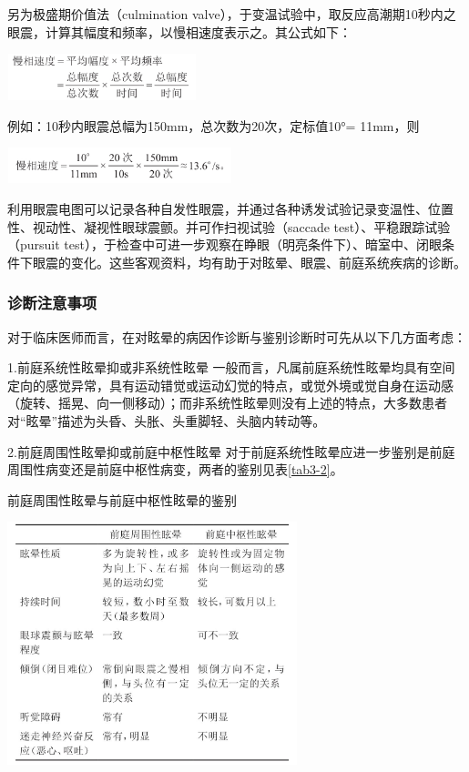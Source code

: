 另为极盛期价值法（culmination
valve），于变温试验中，取反应高潮期10秒内之眼震，计算其幅度和频率，以慢相速度表示之。其公式如下：

\includegraphics[width=2.16667in,height=0.53125in]{./images/Image00013.jpg}

例如：10秒内眼震总幅为150mm，总次数为20次，定标值10°= 11mm，则

\includegraphics[width=2.57292in,height=0.40625in]{./images/Image00014.jpg}

利用眼震电图可以记录各种自发性眼震，并通过各种诱发试验记录变温性、位置性、视动性、凝视性眼球震颤。并可作扫视试验（saccade
test）、平稳跟踪试验（pursuit
test），于检查中可进一步观察在睁眼（明亮条件下）、暗室中、闭眼条件下眼震的变化。这些客观资料，均有助于对眩晕、眼震、前庭系统疾病的诊断。

\subsubsection{诊断注意事项}

对于临床医师而言，在对眩晕的病因作诊断与鉴别诊断时可先从以下几方面考虑：

1.前庭系统性眩晕抑或非系统性眩晕
一般而言，凡属前庭系统性眩晕均具有空间定向的感觉异常，具有运动错觉或运动幻觉的特点，或觉外境或觉自身在运动感（旋转、摇晃、向一侧移动）；而非系统性眩晕则没有上述的特点，大多数患者对“眩晕”描述为头昏、头胀、头重脚轻、头脑内转动等。

2.前庭周围性眩晕抑或前庭中枢性眩晕
对于前庭系统性眩晕应进一步鉴别是前庭周围性病变还是前庭中枢性病变，两者的鉴别见表\ref{tab3-2}。

\begin{table}[htbp]
\centering
\caption{前庭周围性眩晕与前庭中枢性眩晕的鉴别}
\label{tab3-2}
\includegraphics[width=3.3125in,height=2.78125in]{./images/Image00015.jpg}
\end{table}

